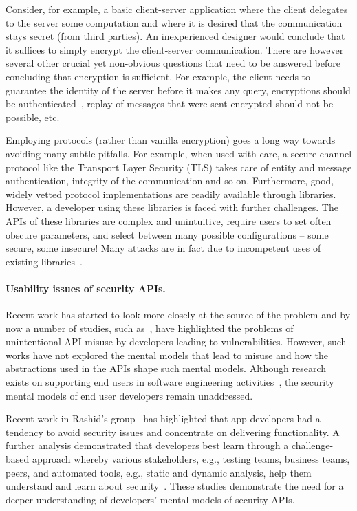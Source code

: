 \documentclass[10pt]{article}
\begin{document}
Consider, for example, a basic client-server application where the client delegates to the server some computation and where it is desired that the communication stays secret (from third parties).
An inexperienced designer would conclude that it suffices to simply encrypt the client-server communication. 
There are however several other crucial yet non-obvious questions that need to be answered before concluding that  encryption is sufficient. 
For example, the client needs to guarantee the identity of the server before it makes any query, encryptions should be authenticated~\cite{BN08}, replay of messages that were sent encrypted should not be possible, etc. 

Employing protocols (rather than vanilla encryption) goes a long way towards avoiding many subtle pitfalls.  
For example, when used with care, a secure channel protocol like the Transport Layer Security (TLS) takes care of entity and message authentication, integrity of the communication and so on.  Furthermore, good, widely vetted protocol implementations are readily available through libraries.  However, a developer using these libraries is faced with further challenges.  The APIs of these libraries are complex and unintuitive, require users to set often obscure parameters, and select between many possible configurations -- some secure, some insecure!  Many attacks are in fact due to incompetent uses of existing libraries~\cite{GIJABS12}. 

\paragraph{Usability issues of security APIs.} 
Recent work has started to look more closely at the source of the problem 
 and by now a number of studies, such as~\cite{enck2011, fahl2012, fischer2017}, have highlighted the problems of unintentional API misuse by developers leading to vulnerabilities. However, such works have not explored the mental models that lead to misuse and how the abstractions used in the APIs shape such mental models. Although research exists on supporting end users in software engineering activities~\cite{ko2011}, the security mental models of end user developers remain unaddressed. 

Recent work in Rashid's group~\cite{weir2016} has highlighted that app developers had a tendency to avoid security issues and concentrate on delivering functionality. A further analysis demonstrated that developers best learn through a challenge-based approach whereby various stakeholders, e.g., testing teams, business teams, peers, and automated tools, e.g., static and dynamic analysis, help them understand and learn about security~\cite{weir2017}. These studies demonstrate the need for a deeper understanding of developers' mental models of security APIs. 
\end{document}
